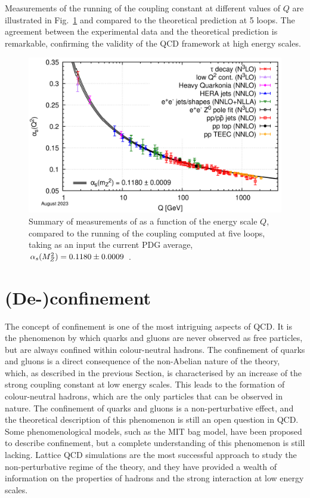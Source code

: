 Measurements of the running of the coupling constant at different values of $Q$ are illustrated in Fig.~\ref{fig:alpha_s_running} and compared to the theoretical prediction at 5 loops. The agreement between the experimental data and the theoretical prediction is remarkable, confirming the validity of the QCD framework at high energy scales.


\begin{figure}[htb]
    \centering
    \includegraphics[width=0.7\linewidth]{Figures/Chapter 1/Alpha_s_running.png}
    \caption{Summary of measurements of \als as a function of the energy scale $Q$, compared to the running of the coupling computed at five loops, taking as an input the current PDG average, $\alpha_s(M_Z^2) = 0.1180 \pm 0.0009$ \gevcc.}
    \label{fig:alpha_s_running}
\end{figure}

\section{(De-)confinement}
The concept of confinement is one of the most intriguing aspects of QCD. It is the phenomenon by which quarks and gluons are never observed as free particles, but are always confined within colour-neutral hadrons. The confinement of quarks and gluons is a direct consequence of the non-Abelian nature of the theory, which, as described in the previous Section, is characterised by an increase of the strong coupling constant at low energy scales. This leads to the formation of colour-neutral hadrons, which are the only particles that can be observed in nature. The confinement of quarks and gluons is a non-perturbative effect, and the theoretical description of this phenomenon is still an open question in QCD. Some phenomenological models, such as the MIT bag model, have been proposed to describe confinement, but a complete understanding of this phenomenon is still lacking. Lattice QCD simulations are the most successful approach to study the non-perturbative regime of the theory, and they have provided a wealth of information on the properties of hadrons and the strong interaction at low energy scales.

